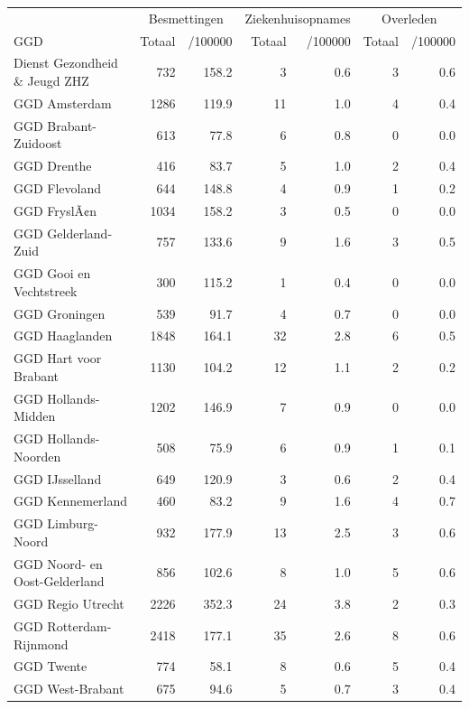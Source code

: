 \documentclass[
  english,
  man,floatsintext]{apa6}
\begin{document}
\begin{table}
\centering\begingroup\fontsize{10}{12}\selectfont

\begin{threeparttable}
\begin{tabular}{lrrrrrr}
\toprule
\multicolumn{1}{c}{ } & \multicolumn{2}{c}{Besmettingen} & \multicolumn{2}{c}{Ziekenhuisopnames} & \multicolumn{2}{c}{Overleden} \\
\cmidrule(l{3pt}r{3pt}){2-3} \cmidrule(l{3pt}r{3pt}){4-5} \cmidrule(l{3pt}r{3pt}){6-7}
GGD & Totaal & /100000 & Totaal & /100000 & Totaal & /100000\\
\midrule
Dienst Gezondheid \& Jeugd ZHZ & 732 & 158.2 & 3 & 0.6 & 3 & 0.6\\
GGD Amsterdam & 1286 & 119.9 & 11 & 1.0 & 4 & 0.4\\
GGD Brabant-Zuidoost & 613 & 77.8 & 6 & 0.8 & 0 & 0.0\\
GGD Drenthe & 416 & 83.7 & 5 & 1.0 & 2 & 0.4\\
GGD Flevoland & 644 & 148.8 & 4 & 0.9 & 1 & 0.2\\
GGD FryslÃ¢n & 1034 & 158.2 & 3 & 0.5 & 0 & 0.0\\
GGD Gelderland-Zuid & 757 & 133.6 & 9 & 1.6 & 3 & 0.5\\
GGD Gooi en Vechtstreek & 300 & 115.2 & 1 & 0.4 & 0 & 0.0\\
GGD Groningen & 539 & 91.7 & 4 & 0.7 & 0 & 0.0\\
GGD Haaglanden & 1848 & 164.1 & 32 & 2.8 & 6 & 0.5\\
GGD Hart voor Brabant & 1130 & 104.2 & 12 & 1.1 & 2 & 0.2\\
GGD Hollands-Midden & 1202 & 146.9 & 7 & 0.9 & 0 & 0.0\\
GGD Hollands-Noorden & 508 & 75.9 & 6 & 0.9 & 1 & 0.1\\
GGD IJsselland & 649 & 120.9 & 3 & 0.6 & 2 & 0.4\\
GGD Kennemerland & 460 & 83.2 & 9 & 1.6 & 4 & 0.7\\
GGD Limburg-Noord & 932 & 177.9 & 13 & 2.5 & 3 & 0.6\\
GGD Noord- en Oost-Gelderland & 856 & 102.6 & 8 & 1.0 & 5 & 0.6\\
GGD Regio Utrecht & 2226 & 352.3 & 24 & 3.8 & 2 & 0.3\\
GGD Rotterdam-Rijnmond & 2418 & 177.1 & 35 & 2.6 & 8 & 0.6\\
GGD Twente & 774 & 58.1 & 8 & 0.6 & 5 & 0.4\\
GGD West-Brabant & 675 & 94.6 & 5 & 0.7 & 3 & 0.4\\

\end{tabular}
\end{threeparttable}
\end{table}
\end{document}
